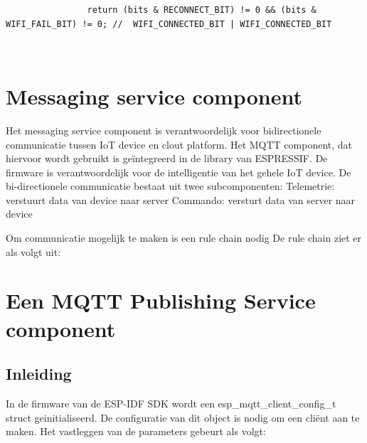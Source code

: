 		
		\lstset{language=java}
		
		\begin{Aanpassen}
			\begin{lstlisting}
				return (bits & RECONNECT_BIT) != 0 && (bits & WIFI_FAIL_BIT) != 0; //  WIFI_CONNECTED_BIT | WIFI_CONNECTED_BIT
			\end{lstlisting}
		\end{Aanpassen}\\
		
		
		
		\begin{center}
		\end{center}
		
		
		
		
		
		\section{Messaging service component}
		
		Het messaging service component is verantwoordelijk voor bidirectionele communicatie tussen IoT device en clout platform. Het MQTT component, dat hiervoor wordt gebruikt  is geïntegreerd in de library van ESPRESSIF.
		De firmware is verantwoordelijk voor de intelligentie van het gehele IoT device.  De bi-directionele communicatie bestaat uit twee subcomponenten:
		Telemetrie: verstuurt data van device naar server
		Commando: versturt data van server naar device
		
		Om communicatie mogelijk te maken is een rule chain nodig De rule chain ziet er als volgt uit:
		
		
		\begin{center}
		\end{center}
		
		
		\section{Een MQTT Publishing Service component }
		
		\subsection{Inleiding }
		In de firmware van de ESP-IDF SDK wordt een esp_mqtt_client_config_t  struct geinitialiseerd. De configuratie van dit object is nodig om een cliënt aan te maken. Het vastleggen van de parameters gebeurt als volgt: 
		
